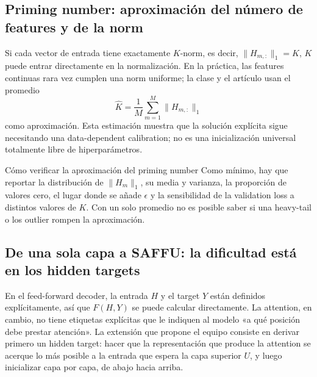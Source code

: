 \documentclass[a4paper]{article}
\begin{document}

\subsection{Priming number: aproximación del número de features y de la norm}

Si cada vector de entrada tiene exactamente $K$-norm, es decir, $\|H_{m,:}\|_1=K$, $K$ puede entrar directamente en la normalización. En la práctica, las features continuas rara vez cumplen una norm uniforme; la clase y el artículo usan el promedio
\[
\widehat K=\frac{1}{M}\sum_{m=1}^{M}\|H_{m,:}\|_1
\]
como aproximación. Esta estimación muestra que la solución explícita sigue necesitando una data-dependent calibration; no es una inicialización universal totalmente libre de hiperparámetros.

\begin{knowledgebox}{Cómo verificar la aproximación del priming number}
Como mínimo, hay que reportar la distribución de $\|H_m\|_1$, su media y varianza, la proporción de valores cero, el lugar donde se añade $\epsilon$ y la sensibilidad de la validation loss a distintos valores de $K$. Con un solo promedio no es posible saber si una heavy-tail o los outlier rompen la aproximación.
\end{knowledgebox}


\subsection{De una sola capa a SAFFU: la dificultad está en los hidden targets}

En el feed-forward decoder, la entrada $H$ y el target $Y$ están definidos explícitamente, así que $F(H,Y)$ se puede calcular directamente. La attention, en cambio, no tiene etiquetas explícitas que le indiquen al modelo «a qué posición debe prestar atención». La extensión que propone el equipo consiste en derivar primero un hidden target: hacer que la representación que produce la attention se acerque lo más posible a la entrada que espera la capa superior $U$, y luego inicializar capa por capa, de abajo hacia arriba.
\end{document}
